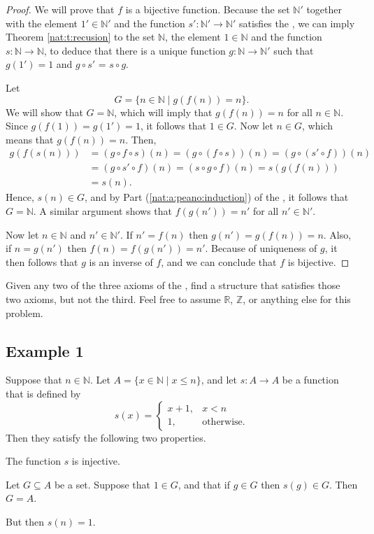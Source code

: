 \begin{proof}
	We will prove that $f$ is a bijective function. Because the set $\mathbb{N}'$ together with the element $1' \in \mathbb{N}'$ and the function $s': \mathbb{N}' \to \mathbb{N}'$ satisfies the , we can imply Theorem \ref{nat:t:recusion} to the set $\mathbb{N}$, the element $1 \in \mathbb{N}$ and the function $s: \mathbb{N} \to \mathbb{N}$, to deduce that there is a unique function $g: \mathbb{N} \to \mathbb{N}'$ such that $g(1') = 1$ and $g \circ s'$ = $s \circ g$.

	Let
	$$
		G = \{ n \in \mathbb{N} \mid g(f(n)) = n \}.
	$$
	We will show that $G = \mathbb{N}$, which will imply that $g(f(n)) = n$ for all $n \in \mathbb{N}$. Since ${g(f(1)) = g(1') = 1}$, it follows that $1 \in G$. Now let $n \in G$, which means that $g(f(n)) = n$. Then,
	\begin{align*}
		g(f(s(n))) & = (g \circ f \circ s)(n) = (g \circ (f \circ s))(n) = (g \circ (s' \circ f))(n) \\
		           & = (g \circ s' \circ f)(n) = (s \circ g \circ f)(n) = s(g(f(n)))                 \\
		           & = s(n).
	\end{align*}
	Hence, $s(n) \in G$, and by Part (\ref{nat:a:peano:induction}) of the , it follows that $G = \mathbb{N}$. A similar argument shows that $f(g(n')) = n'$ for all $n' \in \mathbb{N}'$.

	Now let $n \in \mathbb{N}$ and $n' \in \mathbb{N}'$. If $n' = f(n)$ then $g(n') = g(f(n)) = n$. Also, if $n = g(n')$ then $f(n) = f(g(n')) = n'$. Because of uniqueness of $g$, it then follows that $g$ is an inverse of $f$, and we can conclude that $f$ is bijective.
\end{proof}


\Newpage
\begin{exercise} %
	Given any two of the three axioms of the , find a structure that satisfies those two axioms, but not the third. Feel free to assume $\mathbb{R}$, $\mathbb{Z}$, or anything else for this problem.
\end{exercise}

\subsection*{Example 1}
Suppose that $n \in \mathbb{N}$. Let $A = \{ x \in \mathbb{N} \mid x \leq n \}$, and let $s: A \to A$ be a function that is defined by
$$
	s(x) = \begin{cases}
		x + 1, & x < n            \\
		1,     & \text{otherwise}.
	\end{cases}
$$
Then they satisfy the following two properties.
\begin{lenumerate}
	\item The function $s$ is injective.
	\item Let $G \subseteq A$ be a set. Suppose that $1 \in G$, and that if $g \in G$ then $s(g) \in G$. Then
	      $G = A$.
\end{lenumerate}
But then $s(n) = 1$.

